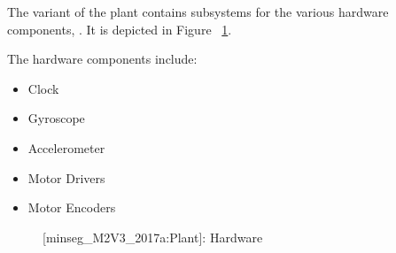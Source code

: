 \documentclass[crop=false,float=true,class=scrreprt]{standalone}
\begin{document}
The  variant of the plant contains subsystems for the various hardware components,
{}.
It is depicted in Figure~%
\ref{FIG:testPlatform:simulink:plant:hardware}.

The hardware components include:

\begin{itemize}[leftmargin=*,itemsep=-1em]

\item Clock
      
\item Gyroscope
      
\item Accelerometer
      
\item Motor Drivers
      
\item Motor Encoders

\end{itemize}




\vspace*{\fill}
\begin{figure}[H]%
\centering%
%
\caption[{[minseg\_M2V3\_2017a:Plant]: Hardware}]%
        {{[minseg\_M2V3\_2017a:Plant]: Hardware%
          \label{FIG:testPlatform:simulink:plant:hardware}%
        }}%
\end{figure}
\vspace*{\fill}




\clearpage
\end{document}
